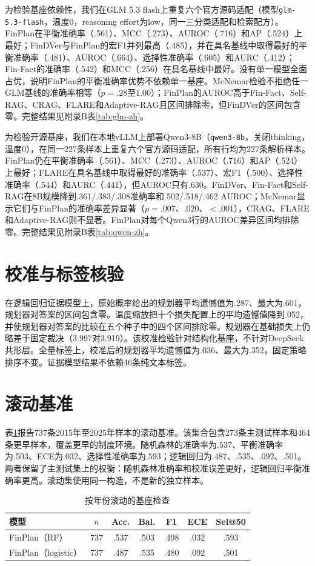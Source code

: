 \documentclass[12pt,openany]{ctexbook}
\begin{document}
为检验基座依赖性，我们在GLM 5.3 flash上重复六个官方源码适配（模型\texttt{glm-5.3-flash}，温度0，reasoning effort为low，同一三分类适配和检索配方）。FinPlan在平衡准确率（.561）、MCC（.273）、AUROC（.716）和AP（.524）上最好；FinDVer与FinPlan的宏F1并列最高（.485），并在具名基线中取得最好的平衡准确率（.481）、AUROC（.664）、选择性准确率（.605）和AURC（.412）；Fin-Fact的准确率（.542）和MCC（.256）在具名基线中最好。没有单一模型全面占优，说明FinPlan的平衡准确率优势不依赖单一基座。McNemar检验不拒绝任一GLM基线的准确率相等（$p=.28$至$1.00$）；FinPlan的AUROC高于Fin-Fact、Self-RAG、CRAG、FLARE和Adaptive-RAG且区间排除零，但FinDVer的区间包含零。完整结果见附录B表\ref{tab:glm-zh}。\par
为检验开源基座，我们在本地vLLM上部署Qwen3-8B\cite{qwen2025qwen3}（\texttt{qwen3-8b}，关闭thinking，温度0），在同一227条样本上重复六个官方源码适配，所有行均为227条解析样本。FinPlan仍在平衡准确率（.561）、MCC（.273）、AUROC（.716）和AP（.524）上最好；FLARE在具名基线中取得最好的准确率（.537）、宏F1（.500）、选择性准确率（.544）和AURC（.441），但AUROC只有.630。FinDVer、Fin-Fact和Self-RAG在8B规模降到.361/.383/.308准确率和.502/.518/.462 AUROC；McNemar显示它们与FinPlan的准确率差异显著（$p=.007$、$.020$、$<.001$），CRAG、FLARE和Adaptive-RAG则不显著。FinPlan对每个Qwen3行的AUROC差异区间均排除零。完整结果见附录B表\ref{tab:qwen-zh}。\par

\section{校准与标签核验}
在逻辑回归证据模型上，原始概率给出的规划器平均遗憾值为.287、最大为.601，规划器对答案的区间包含零。温度缩放把十个损失配置上的平均遗憾值降到.052，并使规划器对答案的比较在五个种子中的四个区间排除零。规划器在基础损失上仍略差于固定裁决（3.997对3.919）。该校准检验针对结构化基座，不针对DeepSeek共形层。全量标签上，校准后的规划器平均遗憾值为.036、最大为.352，固定策略排序不变。证据模型结果不依赖46条纯文本标签。\par

\section{滚动基准}
表\ref{tab:rolling}报告737条2015年至2025年样本的滚动基准。该集合包含273条主测试样本和464条更早样本，覆盖更早的制度环境。随机森林的准确率为.537、平衡准确率为.503、ECE为.032、选择性准确率为.593；逻辑回归为.487、.535、.092、.501。两者保留了主测试集上的权衡：随机森林准确率和校准误差更好，逻辑回归平衡准确率更高。滚动集使用同一构造，不是新的独立样本。\par
\begin{table}[htbp]
\centering
\caption{按年份滚动的基座检查}
\label{tab:rolling}
\begin{tabular}{lcccccc}
\toprule
模型 & $n$ & Acc. & Bal. & F1 & ECE & Sel@50 \\
\midrule
FinPlan（RF） & 737 & .537 & .503 & .498 & .032 & .593 \\
FinPlan（logistic） & 737 & .487 & .535 & .480 & .092 & .501 \\
\bottomrule
\end{tabular}
\end{table}
\end{document}
